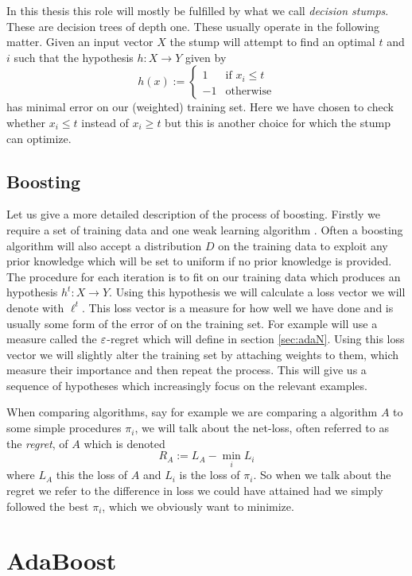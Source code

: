 \par In this thesis this role will mostly be fulfilled by what we call \textit{decision stumps}. These are decision trees of depth one. These usually operate in the following matter. Given an input vector $X$ the stump will attempt to find an optimal $t$ and $i$ such that the hypothesis $h:X\to Y$ given by $$h(x):=\begin{cases}1 &\text{if }x_i\leq t \\ -1 &\text{otherwise}\end{cases}$$ has minimal error on our (weighted) training set. Here we have chosen to check whether $x_i\leq t$ instead of $x_i\geq t$ but this is another choice for which the stump can optimize. 
\newpage
\subsection{Boosting}
\label{subsec:boost}

Let us give a more detailed description of the process of boosting. Firstly we require a set of training data and one weak learning algorithm \weak. Often a boosting algorithm will also accept a distribution $D$ on the training data to exploit any prior knowledge which will be set to uniform if no prior knowledge is provided. The procedure for each iteration is to fit \weak on our training data which produces an hypothesis $h^t:X\to Y$. Using this hypothesis we will calculate a loss vector we will denote with $\ell^t$. This loss vector is a measure for how well we have done and is usually some form of the error of \weak on the training set. For example \adaN will use a measure called the $\varepsilon$-regret which will define in section \ref{sec:adaN}. Using this loss vector we will slightly alter the training set by attaching weights to them, which measure their importance and then repeat the process. This will give us a sequence of hypotheses which increasingly focus on the relevant examples.
\par When comparing algorithms, say for example we are comparing a algorithm $A$ to some simple procedures $\pi_i$, we will talk about the net-loss, often referred to as the \textit{regret}, of $A$ which is denoted $$R_A:=L_A-\min_i L_i$$ where $L_A$ this the loss of $A$ and $L_i$ is the loss of $\pi_i$. So when we talk about the regret we refer to the difference in loss we could have attained had we simply followed the best $\pi_i$, which we obviously want to minimize.

\section{AdaBoost}
\label{sec:ada}
